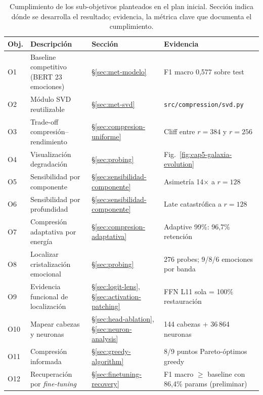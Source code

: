\begin{table}[ht]
\centering
\caption{Cumplimiento de los sub-objetivos planteados en el plan inicial.
Sección indica dónde se desarrolla el resultado; evidencia, la métrica
clave que documenta el cumplimiento.}
\label{tab:objetivos-cumplimiento}
\footnotesize
\begin{tabular}{@{}p{0.45cm} p{4.6cm} p{2.9cm} p{4.6cm}@{}}
\toprule
\textbf{Obj.} & \textbf{Descripción} & \textbf{Sección} & \textbf{Evidencia} \\
\midrule
O1  & Baseline competitivo (BERT 23 emociones) & \S\ref{sec:met-modelo}     & F1 macro 0{,}577 sobre test \\
O2  & Módulo SVD reutilizable                 & \S\ref{sec:met-svd}        & \texttt{src/compression/svd.py} \\
O3  & Trade-off compresión--rendimiento       & \S\ref{sec:compresion-uniforme} & Cliff entre $r{=}384$ y $r{=}256$ \\
O4  & Visualización degradación               & \S\ref{sec:probing}        & Fig.~\ref{fig:cap5-galaxia-evolution} \\
O5  & Sensibilidad por componente             & \S\ref{sec:sensibilidad-componente} & Asimetría 14$\times$ a $r{=}128$ \\
O6  & Sensibilidad por profundidad            & \S\ref{sec:sensibilidad-componente} & Late catastrófica a $r{=}128$ \\
O7  & Compresión adaptativa por energía       & \S\ref{sec:compresion-adaptativa} & Adaptive 99\%: 96{,}7\% retención \\
O8  & Localizar cristalización emocional      & \S\ref{sec:probing}        & 276 probes; 9/8/6 emociones por banda \\
O9  & Evidencia funcional de localización     & \S\ref{sec:logit-lens}, \S\ref{sec:activation-patching} & FFN L11 sola = 100\% restauración \\
O10 & Mapear cabezas y neuronas               & \S\ref{sec:head-ablation}, \S\ref{sec:neuron-analysis} & 144 cabezas + 36\,864 neuronas \\
O11 & Compresión informada                    & \S\ref{sec:greedy-algorithm} & 8/9 puntos Pareto-óptimos greedy \\
O12 & Recuperación por \emph{fine-tuning}      & \S\ref{sec:finetuning-recovery} & F1 macro $\geq$ baseline con 86{,}4\% params (preliminar) \\
\bottomrule
\end{tabular}
\end{table}

